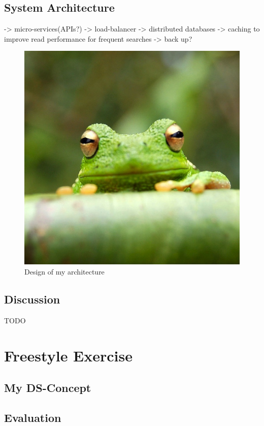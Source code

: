 \documentclass{article}
\begin{document}
\subsection{System Architecture}
-> micro-services(APIs?)
-> load-balancer
-> distributed databases
-> caching to improve read performance for frequent searches
-> back up?
\begin{figure}[h]
\includegraphics[width=\textwidth]{frog.jpg}
\caption{Design of my architecture}
\end{figure}






\subsection{Discussion}
TODO

\section{Freestyle Exercise}
\subsection{My DS-Concept}

\subsection{Evaluation}

\printbibliography[heading=bibintoc]
\end{document}

